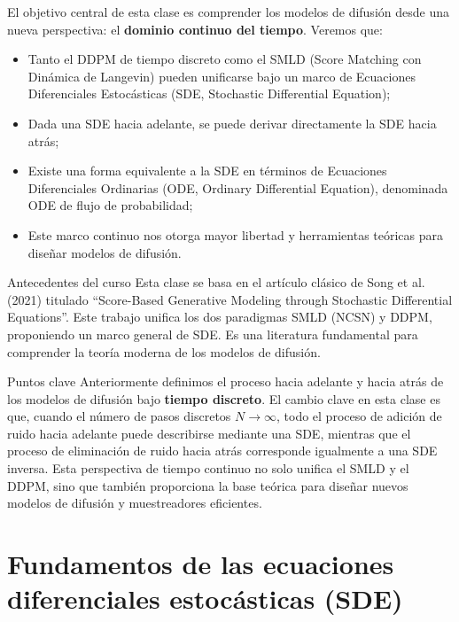 \documentclass[a4paper]{article}
\begin{document}
El objetivo central de esta clase es comprender los modelos de difusión desde una nueva perspectiva: el \textbf{dominio continuo del tiempo}. Veremos que:

\begin{itemize}
    \item Tanto el DDPM de tiempo discreto como el SMLD (Score Matching con Dinámica de Langevin) pueden unificarse bajo un marco de Ecuaciones Diferenciales Estocásticas (SDE, Stochastic Differential Equation);
    \item Dada una SDE hacia adelante, se puede derivar directamente la SDE hacia atrás;
    \item Existe una forma equivalente a la SDE en términos de Ecuaciones Diferenciales Ordinarias (ODE, Ordinary Differential Equation), denominada ODE de flujo de probabilidad;
    \item Este marco continuo nos otorga mayor libertad y herramientas teóricas para diseñar modelos de difusión.
\end{itemize}

\begin{knowledgebox}{Antecedentes del curso}
Esta clase se basa en el artículo clásico de Song et al. (2021) titulado ``Score-Based Generative Modeling through Stochastic Differential Equations''. Este trabajo unifica los dos paradigmas SMLD (NCSN) y DDPM, proponiendo un marco general de SDE. Es una literatura fundamental para comprender la teoría moderna de los modelos de difusión.
\end{knowledgebox}

\begin{importantbox}{Puntos clave}
Anteriormente definimos el proceso hacia adelante y hacia atrás de los modelos de difusión bajo \textbf{tiempo discreto}. El cambio clave en esta clase es que, cuando el número de pasos discretos $N \to \infty$, todo el proceso de adición de ruido hacia adelante puede describirse mediante una SDE, mientras que el proceso de eliminación de ruido hacia atrás corresponde igualmente a una SDE inversa. Esta perspectiva de tiempo continuo no solo unifica el SMLD y el DDPM, sino que también proporciona la base teórica para diseñar nuevos modelos de difusión y muestreadores eficientes.
\end{importantbox}
\section{Fundamentos de las ecuaciones diferenciales estocásticas (SDE)}
\end{document}
